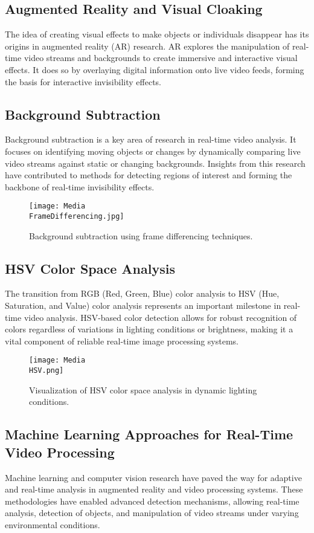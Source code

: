 \documentclass[onecolumn]{article} %
\begin{document}
\subsection{Augmented Reality and Visual Cloaking}
The idea of creating visual effects to make objects or individuals disappear has its origins in augmented reality (AR) research. AR explores the manipulation of real-time video streams and backgrounds to create immersive and interactive visual effects. It does so by overlaying digital information onto live video feeds, forming the basis for interactive invisibility effects.

\subsection{Background Subtraction}
Background subtraction is a key area of research in real-time video analysis. It focuses on identifying moving objects or changes by dynamically comparing live video streams against static or changing backgrounds. Insights from this research have contributed to methods for detecting regions of interest and forming the backbone of real-time invisibility effects.

\begin{figure}[h!]
    \centering
    \texttt{[image: Media\\FrameDifferencing.jpg]}
    \caption{Background subtraction using frame differencing techniques.}
    \label{fig:background_subtraction}
\end{figure}

\subsection{HSV Color Space Analysis}
The transition from RGB (Red, Green, Blue) color analysis to HSV (Hue, Saturation, and Value) color analysis represents an important milestone in real-time video analysis. HSV-based color detection allows for robust recognition of colors regardless of variations in lighting conditions or brightness, making it a vital component of reliable real-time image processing systems.

\begin{figure}[h!]
    \centering
    \texttt{[image: Media\\HSV.png]}
    \caption{Visualization of HSV color space analysis in dynamic lighting conditions.}
    \label{fig:hsv_analysis}
\end{figure}

\subsection{Machine Learning Approaches for Real-Time Video Processing}
Machine learning and computer vision research have paved the way for adaptive and real-time analysis in augmented reality and video processing systems. These methodologies have enabled advanced detection mechanisms, allowing real-time analysis, detection of objects, and manipulation of video streams under varying environmental conditions.
\end{document}
